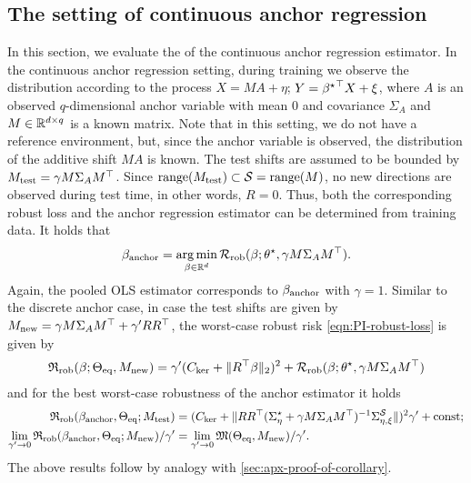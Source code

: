 \subsection{The setting of continuous anchor regression \cite{rothenhausler2021anchor}}\label{subsec:anchor}
In this section, we evaluate the \idRRs of the continuous anchor regression estimator.
    In the continuous anchor regression setting, during training we 
    observe the distribution %
    according to the process $X = M A + \eta$; $Y = {\beta^{\star}}^\top X + \xi$, where $A$ is an observed $q$-dimensional anchor variable with mean $0$ and covariance $\Sigma_A$ and $M \in \mathbb{R}^{d \times q}$ is a known matrix. Note that in this setting, we do not have a reference environment, but, since the anchor variable is observed, the distribution of the additive shift $M A$ is known.  The test shifts are assumed to be bounded by $M_{\mathrm{test}} = \gamma M \Sigma_A M^\top$. Since $\mathrm{range}(M_{\mathrm{test}} )\subset \mathcal{S} = \mathrm{range}(M)$, no new directions are observed during test time, in other words, $R = 0$. Thus, both the corresponding robust loss and the anchor regression estimator can be determined from training data. It holds that
\begin{align*}
    \beta_{\text{anchor}} = \operatorname*{arg\,min}_{\beta \in \mathbb{R}^d} \mathcal{R}_{\mathrm{rob}}(\beta; \theta^{\star},\gamma M \Sigma_A M^\top).
\end{align*}
Again, the pooled OLS estimator corresponds to $\beta_{\text{anchor}}$ with $\gamma = 1$. Similar to the discrete anchor case, in case the test shifts are given by $M_{\mathrm{new}} = \gamma M \Sigma_A M^\top + \gamma' R R^\top$, the worst-case robust risk \eqref{eqn:PI-robust-loss} is given by
\begin{align*}
    \mathfrak{R}_{\mathrm{rob}}(\beta; \Theta_{\mathrm{eq}}, M_{\mathrm{new}}) = \gamma' (C_{\mathrm{ker}} + \| R^\top \beta \|_2)^2 + \mathcal{R}_{\mathrm{rob}}(\beta; \theta^{\star},\gamma M \Sigma_A M^\top) 
\end{align*}
and for the best worst-case robustness of the anchor estimator it holds 
\begin{align*}
    \mathfrak{R}_{\mathrm{rob}}(\beta_{\text{anchor}}, \Theta_{\mathrm{eq}}; M_{\mathrm{test}})&= (C_{\mathrm{ker}} + \| R R^\top (\Sigma^\star_{\eta} + \gamma M \Sigma_A M^\top )^{-1} \Sigma^{\mathcal{S}}_{\eta,\xi} \| )^2 \gamma' + \text{const}; \\
    \lim_{\gamma' \to 0} \mathfrak{R}_{\mathrm{rob}}(\beta_{\text{anchor}}, \Theta_{\mathrm{eq}};M_{\mathrm{new}})/\gamma' &= \lim_{\gamma' \to 0} \mathfrak{M}(\Theta_{\mathrm{eq}}, M_{\mathrm{new}})/ {\gamma'}.
\end{align*}
The above results follow by analogy with \cref{sec:apx-proof-of-corollary}.

